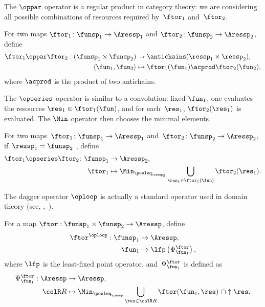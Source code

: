 The $\oppar$ operator is a regular product in category theory: we
are considering all possible combinations of resources required by~$\ftor_{1}$
and~$\ftor_{2}$.
\begin{definition}
    \label{def:opmaps}For two maps $\ftor_{1}\colon\funsp_{1}\rightarrow\Aressp_{1}$
    and $\ftor_{2}\colon\funsp_{2}\rightarrow\Aressp_{2}$, define
    \begin{align*}
        \ftor_{1}\oppar\ftor_{2}:(\funsp_{1}\times\funsp_{2}) & \rightarrow\antichains(\ressp_{1}\times\ressp_{2}),\\
        \left\langle \fun_{1},\fun_{2}\right\rangle  & \mapsto\ftor_{1}(\fun_{1})\acprod\ftor_{2}(\fun_{2}),
    \end{align*}
    where $\acprod$ is the product of two antichains.
\end{definition}
The $\opseries$ operator is similar to a convolution: fixed $\fun_{1}$,
one evaluates the resources $\res_{1}\in\ftor_{1}(\fun)$, and for
each~$\res_{1}$, $\ftor_{2}(\res_{1})$ is evaluated. The $\Min$
operator then chooses the minimal elements.
\begin{definition}
    \label{def:opseries}For two maps~$\ftor_{1}\colon\funsp_{1}\rightarrow\Aressp_{1}$
    and~$\ftor_{2}\colon\funsp_{2}\rightarrow\Aressp_{2}$, if~$\ressp_{1}=\funsp_{2}$
    , define
    \begin{align*}
    {\displaystyle \ftor_{1}\opseries\ftor_{2}\colon\funsp_{1}}
        & \rightarrow\Aressp_{2},\\
        \ftor_{1} & \mapsto\Min_{\posleq_{\ressp_{2}}}\bigcup_{\res_{1}\in\ftor_{1}(\fun)}\ftor_{2}(\res_{1}).
    \end{align*}

\end{definition}


The dagger operator $\oploop$ is actually a standard operator used
in domain theory (see, \eg ,~\cite[II-2.29]{gierz03continuous}).
\begin{definition}
    \label{def:oploop}For a map $\ftor:\funsp_{1}\times\funsp_{2}\rightarrow\Aressp$,
    define
    \begin{align}
        \ftor^{\oploop}:\funsp_{1} & \rightarrow\Aressp,\nonumber \\
        \fun_{1} & \mapsto\lfp\left(\Psi_{\fun_{1}}^{\ftor}\right),
    \end{align}
    where $\lfp$ is the least-fixed point operator, and~$\Psi_{\fun_{1}}^{\ftor}$
    is defined as
    \begin{align*}
        \Psi_{\fun_{1}}^{\ftor}:\Aressp & \rightarrow\Aressp,\\
        {\colR R} & \mapsto\Min_{\posleq_{\ressp}}\bigcup_{\res\in{\colR R}}\ftor(\fun_{1},\res)\ \cap\uparrow\res.
    \end{align*}
\end{definition}


